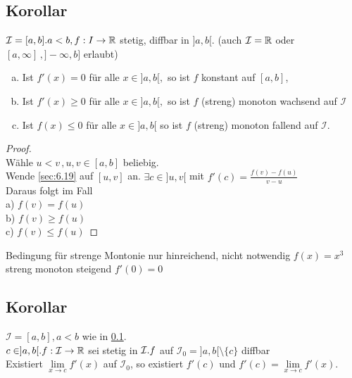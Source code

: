 	\subsection{Korollar}\label{sec:6.20}
	$\mathcal{I} = [a,b]. a<b, f: I \to \mathbb{R}$ stetig, diffbar in $]a,b[$. (auch $\mathcal{I} = \mathbb{R}$ oder $[a,\infty]\, ,]-\infty,b]$ erlaubt)
	\begin{enumerate}[a)]
		\item Ist $f'(x) = 0$ für alle $x \in ]a,b[,$ so ist $f$ konstant auf $[a,b]$,
		\item Ist $f'(x) \ge 0$ für alle $ x\in ]a,b[,$ so ist $f$ (streng) monoton wachsend auf $\mathcal{I}$
		\item Ist $f(x) \le 0$ für alle $x \in ]a,b[$ so ist $f$ (streng) monoton fallend auf $\mathcal{I}$.
	\end{enumerate}
	\begin{minipage}[c]{0.5\textwidth}
	\begin{proof}
		\ \\
		Wähle $u<v\, , u,v \in [a,b]$ beliebig.\\
		Wende \ref{sec:6.19} auf $[u,v]$ an. $\exists c \in ]u,v[$ mit $f'(c) = \frac{f(v)-f(u)}{v-u}$\\
		Daraus folgt im Fall\\
		a) $f(v) = f(u)$\\
		b) $f(v) \ge f(u)$\\
		c) $f(v) \le f(u)$
	\end{proof}
\end{minipage}
\begin{minipage}[t]{0.5\textwidth}
	Bedingung für strenge Montonie nur hinreichend, nicht notwendig $f(x)= x^3$ streng monoton steigend $f'(0)=0$
\end{minipage}
	\subsection{Korollar}\label{sec:6.21}
	$\mathcal{I} = [a,b], a<b$ wie in \ref{sec:6.20}.\\
	$c \in ]a,b[. f: \mathcal{I} \to \mathbb{R} $ sei stetig in $\mathcal{I}.\\
	f$ auf $\mathcal{I}_0 = ]a,b[ \setminus \{c\}$ diffbar\\
	Existiert $\lim\limits_{x \to c} f'(x)$ auf $\mathcal{I}_0$, so existiert $f'(c)$ und $f'(c) = \lim\limits_{x \to c} f'(x).$
